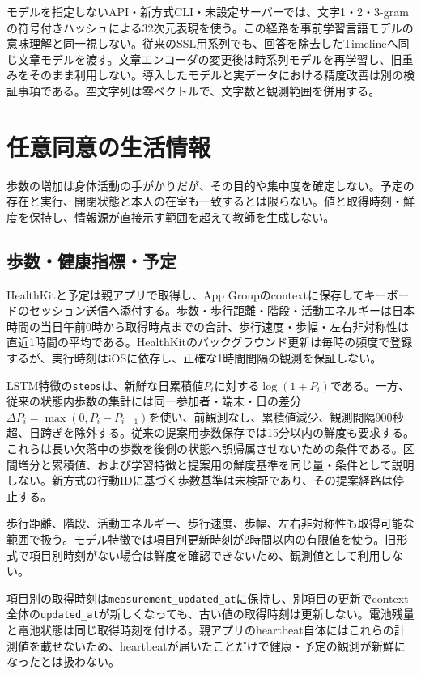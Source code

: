 モデルを指定しないAPI・新方式CLI・未設定サーバーでは、文字1・2・3-gramの符号付きハッシュによる32次元表現を使う。この経路を事前学習言語モデルの意味理解と同一視しない。従来のSSL用系列でも、回答を除去したTimelineへ同じ文章モデルを渡す。文章エンコーダの変更後は時系列モデルを再学習し、旧重みをそのまま利用しない。導入したモデルと実データにおける精度改善は別の検証事項である。空文字列は零ベクトルで、文字数と観測範囲を併用する。

\section{任意同意の生活情報}

歩数の増加は身体活動の手がかりだが、その目的や集中度を確定しない。予定の存在と実行、開閉状態と本人の在室も一致するとは限らない。値と取得時刻・鮮度を保持し、情報源が直接示す範囲を超えて教師を生成しない。

\subsection{歩数・健康指標・予定}

HealthKitと予定は親アプリで取得し、App Groupのcontextに保存してキーボードのセッション送信へ添付する。歩数・歩行距離・階段・活動エネルギーは日本時間の当日午前0時から取得時点までの合計、歩行速度・歩幅・左右非対称性は直近1時間の平均である。HealthKitのバックグラウンド更新は毎時の頻度で登録するが、実行時刻はiOSに依存し、正確な1時間間隔の観測を保証しない。

LSTM特徴の\texttt{steps}は、新鮮な日累積値\(P_i\)に対する\(\log(1+P_i)\)である。一方、従来の状態内歩数の集計には同一参加者・端末・日の差分\(\Delta P_i=\max(0,P_i-P_{i-1})\)を使い、前観測なし、累積値減少、観測間隔900秒超、日跨ぎを除外する。従来の提案用歩数保存では15分以内の鮮度も要求する。これらは長い欠落中の歩数を後側の状態へ誤帰属させないための条件である。区間増分と累積値、および学習特徴と提案用の鮮度基準を同じ量・条件として説明しない。新方式の行動IDに基づく歩数基準は未検証であり、その提案経路は停止する。

歩行距離、階段、活動エネルギー、歩行速度、歩幅、左右非対称性も取得可能な範囲で扱う。モデル特徴では項目別更新時刻が2時間以内の有限値を使う。旧形式で項目別時刻がない場合は鮮度を確認できないため、観測値として利用しない。

項目別の取得時刻は\texttt{measurement\_updated\_at}に保持し、別項目の更新でcontext全体の\texttt{updated\_at}が新しくなっても、古い値の取得時刻は更新しない。電池残量と電池状態は同じ取得時刻を付ける。親アプリのheartbeat自体にはこれらの計測値を載せないため、heartbeatが届いたことだけで健康・予定の観測が新鮮になったとは扱わない。

